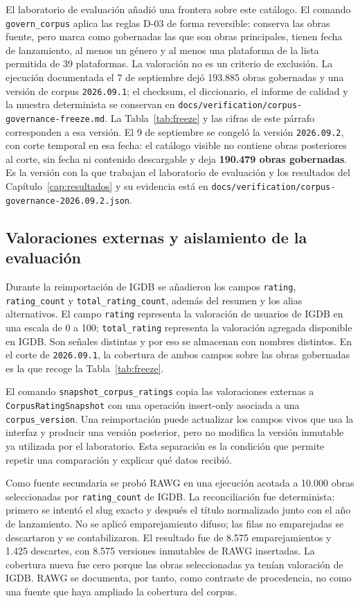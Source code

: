 El laboratorio de evaluación añadió una frontera sobre este catálogo. El comando
\texttt{govern\_corpus} aplica las reglas D-03 de forma reversible: conserva las obras
fuente, pero marca como gobernadas las que son obras principales, tienen fecha de lanzamiento,
al menos un género y al menos una plataforma de la lista permitida de 39 plataformas. La valoración no es un criterio de
exclusión. La ejecución documentada el 7 de septiembre dejó 193.885 obras gobernadas y una versión de corpus
\texttt{2026.09.1}; el checksum, el diccionario, el informe de calidad y la muestra
determinista se conservan en \texttt{docs/verification/corpus-governance-freeze.md}. La
Tabla~\ref{tab:freeze} y las cifras de este párrafo corresponden a esa versión. El 9 de septiembre se
congeló la versión \texttt{2026.09.2}, con corte temporal en esa fecha: el catálogo visible no contiene
obras posteriores al corte, sin fecha ni contenido descargable y deja \textbf{190.479 obras
gobernadas}. Es la versión con la que trabajan el laboratorio de evaluación y los resultados del
Capítulo~\ref{cap:resultados} y su evidencia está en
\texttt{docs/verification/corpus-governance-2026.09.2.json}.

\subsection{Valoraciones externas y aislamiento de la evaluación}\label{sec:datos-ratings}

Durante la reimportación de IGDB se añadieron los campos \texttt{rating},
\texttt{rating\_count} y \texttt{total\_rating\_count}, además del resumen y los alias
alternativos. El campo \texttt{rating} representa la valoración de usuarios de IGDB en una
escala de 0 a 100; \texttt{total\_rating} representa la valoración agregada disponible en
IGDB. Son señales distintas y por eso se almacenan con nombres distintos. En el corte de
\texttt{2026.09.1}, la cobertura de ambos campos sobre las obras gobernadas es la que recoge
la Tabla~\ref{tab:freeze}.

El comando \texttt{snapshot\_corpus\_ratings} copia las valoraciones externas a
\texttt{CorpusRatingSnapshot} con una operación insert-only asociada a una
\texttt{corpus\_version}. Una reimportación puede actualizar los campos vivos que usa la
interfaz y producir una versión posterior, pero no modifica la versión inmutable ya
utilizada por el laboratorio. Esta separación es la condición que permite repetir una
comparación y explicar qué datos recibió.

Como fuente secundaria se probó RAWG en una ejecución acotada a 10.000 obras seleccionadas
por \texttt{rating\_count} de IGDB. La reconciliación fue determinista: primero se intentó
el slug exacto y después el título normalizado junto con el año de lanzamiento. No se aplicó
emparejamiento difuso; las filas no emparejadas se descartaron y se contabilizaron. El resultado
fue de 8.575 emparejamientos y 1.425 descartes, con 8.575 versiones inmutables de RAWG insertadas. La
cobertura nueva fue cero porque las obras seleccionadas ya tenían valoración de IGDB. RAWG se
documenta, por tanto, como contraste de procedencia, no como una fuente que haya ampliado
la cobertura del corpus.

